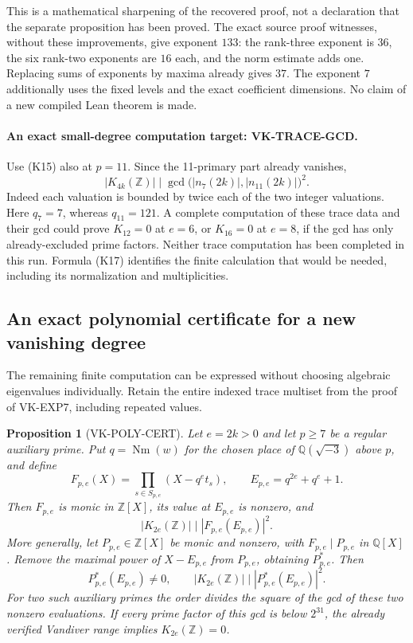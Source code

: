 \documentclass[11pt,a4paper]{article}
\newtheorem{proposition}[theorem]{Proposition}
\theoremstyle{definition}
\begin{document}
This is a mathematical sharpening of the recovered proof,
not a declaration that the separate proposition
 has been proved.
The exact source proof witnesses, without these improvements,
give exponent \(133\): the rank-three exponent is \(36\),
the six rank-two exponents are \(16\) each, and the norm
estimate adds one. Replacing sums of exponents by maxima
already gives \(37\). The exponent \(7\) additionally uses
the fixed levels and the exact coefficient dimensions.
No claim of a new compiled Lean theorem is made.

\paragraph{An exact small-degree computation target: VK-TRACE-GCD.}
Use (K15) also at \(p=11\). Since the 11-primary part
already vanishes,
\[
 |K_{4k}(\mathbb Z)|
 \mid \gcd\bigl(|n_7(2k)|,|n_{11}(2k)|\bigr)^2.       \tag{K17}
\]
Indeed each valuation is bounded by twice each of the two
integer valuations. Here \(q_7=7\), whereas \(q_{11}=121\).
A complete computation of these trace data and their gcd
could prove \(K_{12}=0\) at \(e=6\), or \(K_{16}=0\)
at \(e=8\), if the gcd has only already-excluded prime factors.
Neither trace computation has been completed in this run.
Formula (K17) identifies the finite calculation that would
be needed, including its normalization and multiplicities.

\subsection{An exact polynomial certificate for a new vanishing degree}

The remaining finite computation can be expressed without choosing
algebraic eigenvalues individually. Retain the entire indexed trace
multiset from the proof of VK-EXP7, including repeated values.

\begin{proposition}[VK-POLY-CERT]
Let $e=2k>0$ and let $p\ge7$ be a regular auxiliary prime. Put
$q=\operatorname{Nm}(w)$ for the chosen place of
$\mathbb Q(\sqrt{-3})$ above $p$, and define
\[
 F_{p,e}(X)=\prod_{s\in S_{p,e}}(X-q^e t_s),\qquad
 E_{p,e}=q^{2e}+q^e+1.
\]
Then $F_{p,e}$ is monic in $\mathbb Z[X]$, its value at $E_{p,e}$
is nonzero, and
\[
 |K_{2e}(\mathbb Z)|\mid |F_{p,e}(E_{p,e})|^2.
 \tag{K18a}
\]
More generally, let $P_{p,e}\in\mathbb Z[X]$ be monic and nonzero,
with $F_{p,e}\mid P_{p,e}$ in $\mathbb Q[X]$. Remove the maximal
power of $X-E_{p,e}$ from $P_{p,e}$, obtaining $P^*_{p,e}$.
Then
\[
 P^*_{p,e}(E_{p,e})\ne0,\qquad
 |K_{2e}(\mathbb Z)|\mid |P^*_{p,e}(E_{p,e})|^2.
 \tag{K18b}
\]
For two such auxiliary primes the order divides the square of the
gcd of these two nonzero evaluations. If every prime factor of this
gcd is below $2^{31}$, the already verified Vandiver range implies
$K_{2e}(\mathbb Z)=0$.
\end{proposition}
\end{document}
